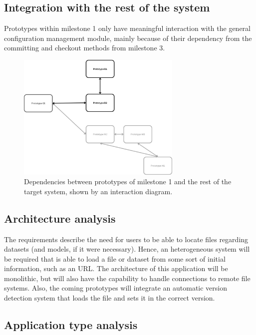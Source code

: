 \subsection{Integration with the rest of the system}

Prototypes within milestone 1 only have meaningful interaction with the general configuration management module, mainly because of their dependency from the committing and
checkout methods from milestone 3. 

\begin{figure}[H]
    \centering
    \includegraphics[width=0.7\textwidth]{figs/D-dependencies.png}
    \caption{Dependencies between prototypes of milestone 1 and the rest of the target system, shown by an interaction diagram.}
\end{figure}

\subsection{Architecture analysis}

The requirements describe the need for users to be able to locate files regarding datasets (and models, if it were necessary). Hence, an heterogeneous system will be 
required that is able to load a file or dataset from some sort of initial information, such as an URL. The architecture of this application will be monolithic, but will 
also have the capability to handle connections to remote file systems. Also, the coming prototypes will integrate an automatic version detection system that loads the file and 
sets it in the correct version.

\subsection{Application type analysis}

